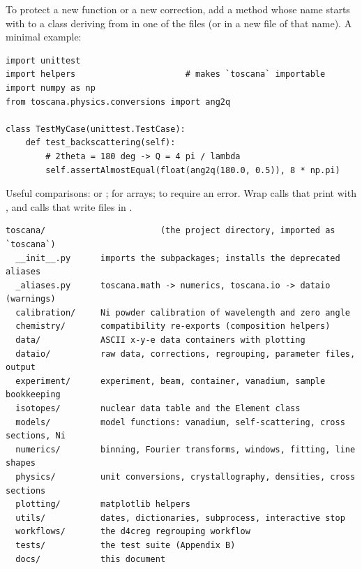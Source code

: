 \documentclass[11pt,a4paper]{article}
\begin{document}

To protect a new function or a new correction, add a method whose name
starts with  to a class deriving from 
in one of the  files (or in a new file of that name). A
minimal example:
\begin{lstlisting}
import unittest
import helpers                      # makes `toscana` importable
import numpy as np
from toscana.physics.conversions import ang2q

class TestMyCase(unittest.TestCase):
    def test_backscattering(self):
        # 2theta = 180 deg -> Q = 4 pi / lambda
        self.assertAlmostEqual(float(ang2q(180.0, 0.5)), 8 * np.pi)
\end{lstlisting}
Useful comparisons:  or
;  for
arrays;  to require an error.
Wrap calls that print with , and calls that write files
in .
\label{app:reference}


\begin{lstlisting}
toscana/                       (the project directory, imported as `toscana`)
  __init__.py      imports the subpackages; installs the deprecated aliases
  _aliases.py      toscana.math -> numerics, toscana.io -> dataio (warnings)
  calibration/     Ni powder calibration of wavelength and zero angle
  chemistry/       compatibility re-exports (composition helpers)
  data/            ASCII x-y-e data containers with plotting
  dataio/          raw data, corrections, regrouping, parameter files, output
  experiment/      experiment, beam, container, vanadium, sample bookkeeping
  isotopes/        nuclear data table and the Element class
  models/          model functions: vanadium, self-scattering, cross sections, Ni
  numerics/        binning, Fourier transforms, windows, fitting, line shapes
  physics/         unit conversions, crystallography, densities, cross sections
  plotting/        matplotlib helpers
  utils/           dates, dictionaries, subprocess, interactive stop
  workflows/       the d4creg regrouping workflow
  tests/           the test suite (Appendix B)
  docs/            this document
\end{lstlisting}
\end{document}
